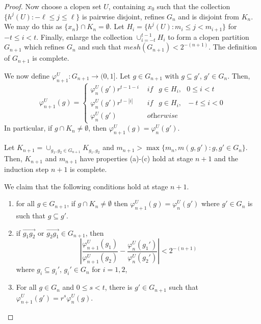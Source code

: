 \documentclass[10pt,a4paper]{amsart}
\newcommand{\cF}{\mathcal{F}}
\newcommand{\fsystem}{\{(G_n, \Psi_n,\varphi^L_n,\varphi^U_n)\}_{n=0}^{\infty}}
\newcommand{\oa}{\overrightarrow}
\begin{document}
\begin{proof}
 Now choose  a clopen set $U$, containing $x_0$ such that the collection $\{h^j(U):-\ell \le j \le \ell \}$ is pairwise disjoint, refines $G_n$ and is disjoint from $K_n$. We may do this as $\{x_n\} \cap K_n = \emptyset$. Let $H_i =\{h^j(U): m_i \le j <m_{i+1} \}$ for $-t \leq i<t$. Finally, enlarge the collection $\cup_{i=-t}^{t-1}H_i$ to form a clopen partition $G_{n+1}$ which refines $G_n$ and such that $mesh (G_{n+1})< 2^{-(n+1)}$. The definition of $G_{n+1}$ is complete.
 
    We now define $\varphi^U_{n+1}: G_{n+1} \rightarrow (0,1]$. Let $g \in G_{n+1}$ with $g \subseteq g'$, $g' \in G_n$. Then,
    \[ \varphi^U_{n+1}(g) = \begin{cases} 
          \varphi^U_n(g') r^{t-1-i }&  \textit { if }  \ \ g \in H_{i},\ \ \ 
           0 \le i < t  \ \ \ \\
           \varphi^U_n(g') r^{t-|i| }&  \textit { if }  \ \ g \in H_{i},  \ \ \ 
           -t \le i < 0 \\
          \varphi^U_n(g')  & \textit{ otherwise }
       \end{cases}
    \]
    In particular, if $g \cap K_n  \neq \emptyset$, then $ \varphi^U_{n+1}(g)= \varphi^U_n(g')$.

  Let  $K_{n+1} = \cup_{g_1,g_2 \in  G_{n+1}} K_{g_1,g_2}$ and $m_{n+1} > \max\{m_n, m(g,g'): g,g' \in G_n \}$. Then, $K_{n+1}$ and $m_{n+1}$ have properties (a)-(c) hold at stage $n+1$ and the induction step $n+1$ is complete. 

We claim that the following conditions hold at stage $n+1$.
    \begin{enumerate}
        \item for all $ g\in G_{n+1}$, if $g\cap K_n \neq \emptyset$ then $\varphi^U_{n+1}(g) = \varphi^U_{n}(g') $
        where $g' \in G_n$ is such that $g \subseteq g'$.
        \item if $\oa{g_1g_2}$ or  $\oa{g_2g_1}\in G_{n+1}$, then 
        \[  \left | \frac{\varphi^U_{n+1}(g_1)}{\varphi^U_{n+1}(g_2)}  -\frac{\varphi^U_n(g_1')}{\varphi^U_n(g_2')}\right | < 2^{-(n+1)}
        \]
        where $g_i \subseteq g_i'$, $g_i' \in G_n$ for $i=1,2$,
 
        \item For all $g \in G_n$ and $ 0\le s < t$, there is $g' \in G_{n+1}$ such that $\varphi^U_{n+1} (g')=r^s\varphi^U_n(g)$.
        
    \end{enumerate}


\end{proof}
\end{document}
